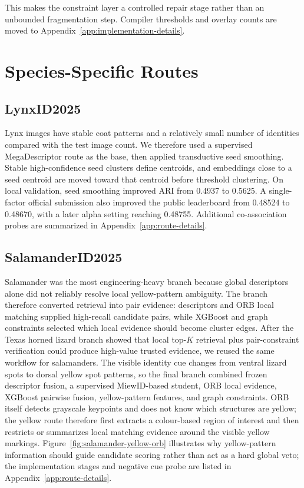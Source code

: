 \documentclass{ceurart}
\begin{document}
This makes the constraint layer a controlled repair stage rather than an unbounded fragmentation step. Compiler thresholds and overlay counts are moved to Appendix~\ref{app:implementation-details}.

\section{Species-Specific Routes}
\subsection{LynxID2025}
Lynx images have stable coat patterns and a relatively small number of identities compared with the test image count. We therefore used a supervised MegaDescriptor route as the base, then applied transductive seed smoothing. Stable high-confidence seed clusters define centroids, and embeddings close to a seed centroid are moved toward that centroid before threshold clustering. On local validation, seed smoothing improved ARI from 0.4937 to 0.5625. A single-factor official submission also improved the public leaderboard from 0.48524 to 0.48670, with a later alpha setting reaching 0.48755.
Additional co-association probes are summarized in Appendix~\ref{app:route-details}.

\subsection{SalamanderID2025}
Salamander was the most engineering-heavy branch because global descriptors alone did not reliably resolve local yellow-pattern ambiguity. The branch therefore converted retrieval into pair evidence: descriptors and ORB local matching supplied high-recall candidate pairs, while XGBoost and graph constraints selected which local evidence should become cluster edges. After the Texas horned lizard branch showed that local top-$K$ retrieval plus pair-constraint verification could produce high-value trusted evidence, we reused the same workflow for salamanders. The visible identity cue changes from ventral lizard spots to dorsal yellow spot patterns, so the final branch combined frozen descriptor fusion, a supervised MiewID-based student, ORB local evidence, XGBoost pairwise fusion, yellow-pattern features, and graph constraints. ORB itself detects grayscale keypoints and does not know which structures are yellow; the yellow route therefore first extracts a colour-based region of interest and then restricts or summarizes local matching evidence around the visible yellow markings. Figure~\ref{fig:salamander-yellow-orb} illustrates why yellow-pattern information should guide candidate scoring rather than act as a hard global veto; the implementation stages and negative cue probe are listed in Appendix~\ref{app:route-details}.
\end{document}
